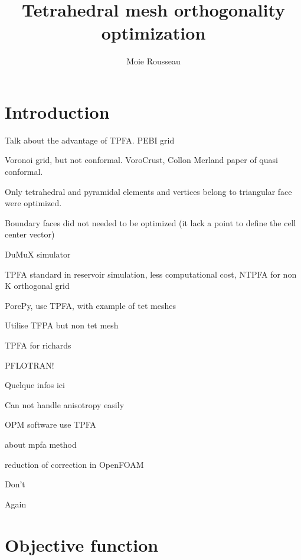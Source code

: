 \documentclass[11pt]{article}
\title{\textbf{Tetrahedral mesh orthogonality optimization}}
\author{Moie Rousseau}
\date{}
\begin{document}
\maketitle
\thispagestyle{empty}

\section{Introduction}

Talk about the advantage of TPFA. PEBI grid

Voronoi grid, but not conformal. VoroCrust, Collon Merland paper of quasi conformal. 

Only tetrahedral and pyramidal elements and vertices belong to triangular face were optimized.

Boundary faces did not needed to be optimized (it lack a point to define the cell center vector)

DuMuX simulator %

TPFA standard in reservoir simulation, less computational cost, NTPFA for non K orthogonal grid %

PorePy, use TPFA, with example of tet meshes %

Utilise TFPA but non tet mesh %

TPFA for richards %

PFLOTRAN!

Quelque infos ici %

Can not handle anisotropy easily %

OPM software use TPFA %

about mpfa method %

reduction of correction in OpenFOAM

Don't

Again


\section{Objective function}
\end{document}
